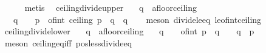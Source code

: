 \begin{isabellebody}
\ \ \ \ \isamarkupfalse%
\ metis\ \isanewline
{}\isamarkupfalse%
%
\endisatagproof
{\isafoldproof}%
%
\isadelimproof
\isanewline
%
\endisadelimproof
\isanewline
{}\isamarkupfalse%
\ ceiling{\isacharunderscore}{\kern0pt}divide{\isacharunderscore}{\kern0pt}upper{\isacharcolon}{\kern0pt}\isanewline
\ \ \ q\ {\isacharcolon}{\kern0pt}{\isacharcolon}{\kern0pt}\ {\isachardoublequoteopen}{\isacharprime}{\kern0pt}a{\isacharcolon}{\kern0pt}{\isacharcolon}{\kern0pt}floor{\isacharunderscore}{\kern0pt}ceiling{\isachardoublequoteclose}\isanewline
\ \ \ {\isachardoublequoteopen}q\ {\isachargreater}{\kern0pt}\ {}\ {\isasymLongrightarrow}\ p\ {\isasymle}\ of{\isacharunderscore}{\kern0pt}int\ {\isacharparenleft}{\kern0pt}ceiling\ {\isacharparenleft}{\kern0pt}p\ {\isacharslash}{\kern0pt}\ q{\isacharparenright}{\kern0pt}{\isacharparenright}{\kern0pt}\ {\isacharasterisk}{\kern0pt}\ q{\isachardoublequoteclose}\isanewline
%
\isadelimproof
\ \ %
\endisadelimproof
%
\isatagproof
{}\isamarkupfalse%
\ {\isacharparenleft}{\kern0pt}meson\ divide{\isacharunderscore}{\kern0pt}le{\isacharunderscore}{\kern0pt}eq\ le{\isacharunderscore}{\kern0pt}of{\isacharunderscore}{\kern0pt}int{\isacharunderscore}{\kern0pt}ceiling{\isacharparenright}{\kern0pt}%
\endisatagproof
{\isafoldproof}%
%
\isadelimproof
\isanewline
%
\endisadelimproof
\isanewline
{}\isamarkupfalse%
\ ceiling{\isacharunderscore}{\kern0pt}divide{\isacharunderscore}{\kern0pt}lower{\isacharcolon}{\kern0pt}\isanewline
\ \ \ q\ {\isacharcolon}{\kern0pt}{\isacharcolon}{\kern0pt}\ {\isachardoublequoteopen}{\isacharprime}{\kern0pt}a{\isacharcolon}{\kern0pt}{\isacharcolon}{\kern0pt}floor{\isacharunderscore}{\kern0pt}ceiling{\isachardoublequoteclose}\isanewline
\ \ \ {\isachardoublequoteopen}q\ {\isachargreater}{\kern0pt}\ {}\ {\isasymLongrightarrow}\ {\isacharparenleft}{\kern0pt}of{\isacharunderscore}{\kern0pt}int\ {\isasymlceil}p\ {\isacharslash}{\kern0pt}\ q{\isasymrceil}\ {\isacharminus}{\kern0pt}\ {}{\isacharparenright}{\kern0pt}\ {\isacharasterisk}{\kern0pt}\ q\ {\isacharless}{\kern0pt}\ p{\isachardoublequoteclose}\isanewline
%
\isadelimproof
\ \ %
\endisadelimproof
%
\isatagproof
{}\isamarkupfalse%
\ {\isacharparenleft}{\kern0pt}meson\ ceiling{\isacharunderscore}{\kern0pt}eq{\isacharunderscore}{\kern0pt}iff\ pos{\isacharunderscore}{\kern0pt}less{\isacharunderscore}{\kern0pt}divide{\isacharunderscore}{\kern0pt}eq{\isacharparenright}{\kern0pt}%

\end{isabellebody}
